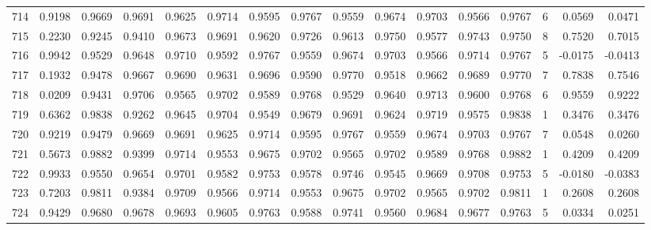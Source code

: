 \begin{tabular}{lrrrrrrrrrrrrrrr}
714 &      0.9198 &  0.9669 &  0.9691 &  0.9625 &  0.9714 &  0.9595 &  0.9767 &  0.9559 &  0.9674 &  0.9703 &   0.9566 &     0.9767 &      6 &                    0.0569 &                     0.0471 \\
715 &      0.2230 &  0.9245 &  0.9410 &  0.9673 &  0.9691 &  0.9620 &  0.9726 &  0.9613 &  0.9750 &  0.9577 &   0.9743 &     0.9750 &      8 &                    0.7520 &                     0.7015 \\
716 &      0.9942 &  0.9529 &  0.9648 &  0.9710 &  0.9592 &  0.9767 &  0.9559 &  0.9674 &  0.9703 &  0.9566 &   0.9714 &     0.9767 &      5 &                   -0.0175 &                    -0.0413 \\
717 &      0.1932 &  0.9478 &  0.9667 &  0.9690 &  0.9631 &  0.9696 &  0.9590 &  0.9770 &  0.9518 &  0.9662 &   0.9689 &     0.9770 &      7 &                    0.7838 &                     0.7546 \\
718 &      0.0209 &  0.9431 &  0.9706 &  0.9565 &  0.9702 &  0.9589 &  0.9768 &  0.9529 &  0.9640 &  0.9713 &   0.9600 &     0.9768 &      6 &                    0.9559 &                     0.9222 \\
719 &      0.6362 &  0.9838 &  0.9262 &  0.9645 &  0.9704 &  0.9549 &  0.9679 &  0.9691 &  0.9624 &  0.9719 &   0.9575 &     0.9838 &      1 &                    0.3476 &                     0.3476 \\
720 &      0.9219 &  0.9479 &  0.9669 &  0.9691 &  0.9625 &  0.9714 &  0.9595 &  0.9767 &  0.9559 &  0.9674 &   0.9703 &     0.9767 &      7 &                    0.0548 &                     0.0260 \\
721 &      0.5673 &  0.9882 &  0.9399 &  0.9714 &  0.9553 &  0.9675 &  0.9702 &  0.9565 &  0.9702 &  0.9589 &   0.9768 &     0.9882 &      1 &                    0.4209 &                     0.4209 \\
722 &      0.9933 &  0.9550 &  0.9654 &  0.9701 &  0.9582 &  0.9753 &  0.9578 &  0.9746 &  0.9545 &  0.9669 &   0.9708 &     0.9753 &      5 &                   -0.0180 &                    -0.0383 \\
723 &      0.7203 &  0.9811 &  0.9384 &  0.9709 &  0.9566 &  0.9714 &  0.9553 &  0.9675 &  0.9702 &  0.9565 &   0.9702 &     0.9811 &      1 &                    0.2608 &                     0.2608 \\
724 &      0.9429 &  0.9680 &  0.9678 &  0.9693 &  0.9605 &  0.9763 &  0.9588 &  0.9741 &  0.9560 &  0.9684 &   0.9677 &     0.9763 &      5 &                    0.0334 &                     0.0251 \\

\end{tabular}
